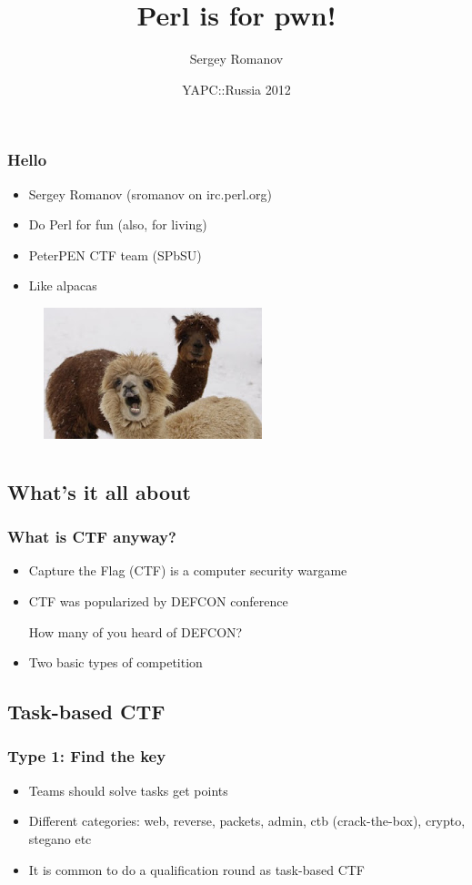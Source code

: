 \documentclass{beamer}
\title{Perl is for pwn!}
\author{Sergey Romanov}
\date{YAPC::Russia 2012}
\begin{document}
\frame{\titlepage}

\frame
{
\frametitle{Hello}
\begin{itemize}
\item Sergey Romanov (sromanov on irc.perl.org)
\item Do Perl for fun (also, for living)
\item PeterPEN CTF team (SPbSU)
\item Like alpacas
\end{itemize}
\begin{figure}
\includegraphics[width=2.5in,height=1.5in]{pics/alpacas.jpg}
\end{figure}
}

\section[CTF]{}

\subsection{What's it all about}
\frame
{
\frametitle{What is CTF anyway?}
\begin{itemize}
\item<1-> Capture the Flag (CTF) is a computer security wargame
\item<2-> CTF was popularized by DEFCON conference
\linebreak

{\Large How many of you heard of DEFCON?}
\item<3-> Two basic types of competition
\end{itemize}
}

\subsection{Task-based CTF}
\frame
{
\frametitle{Type 1: Find the key}
\begin{itemize}
\item Teams should solve tasks get points
\item Different categories: web, reverse, packets, admin, ctb (crack-the-box), crypto, stegano etc
\item It is common to do a qualification round as task-based CTF
\end{itemize}
}
\end{document}
